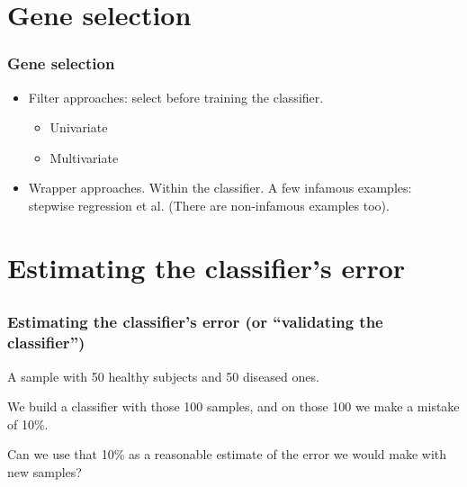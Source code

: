 \section{Gene selection}
\begin{frame}
\frametitle{Gene selection}
\begin{itemize}
\item Filter approaches: select before training the classifier.
\begin{itemize}
\item Univariate
\item Multivariate
\end{itemize}
\item Wrapper approaches. Within the classifier. A few infamous examples:
   stepwise regression et al. (There are non-infamous examples too).
\end{itemize}
\end{frame}


\section[Error estimation]{Estimating the classifier's error}
\subsection{}
\begin{frame}
\frametitle{Estimating the classifier's error (or ``validating the classifier'')} 

A sample with 50 healthy subjects and 50 diseased ones.

We build a classifier with those 100 samples, and on those 100 we make a
mistake of 10\%.
\pause
\vspace*{30pt}

Can we use that 10\% as a reasonable estimate of the error we would make
with new samples?
\end{frame}






